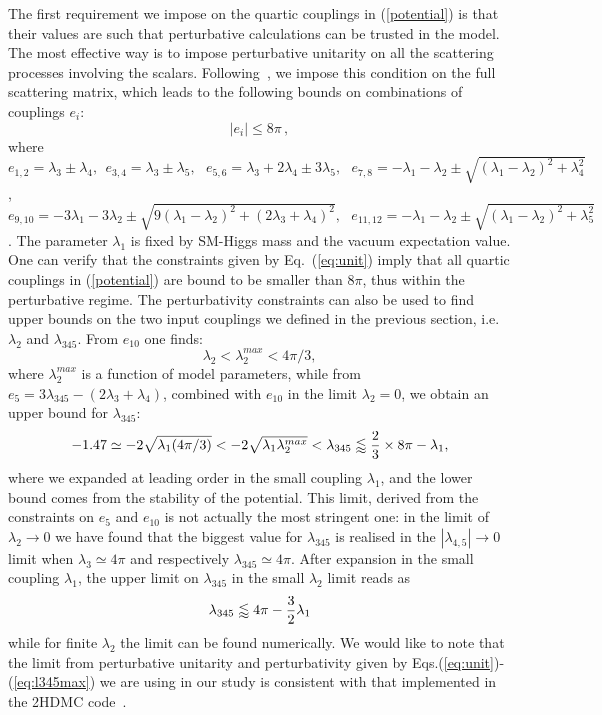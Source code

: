 \documentclass[12pt,a4paper]{article}
\begin{document}
The first requirement we impose on the quartic couplings in (\ref{potential}) is that their values are such that perturbative calculations can be trusted in the model.  The most effective way is to impose perturbative unitarity on all the scattering processes involving the scalars.
Following~\cite{Arhrib:2012ia}, we impose this condition on the full scattering matrix, which leads to the following bounds on combinations of couplings $e_i$:
%
\begin{equation}
\label{eq:unit}
|e_i|\leq 8\pi\,,
\end{equation}
where
$e_{1,2}= \lambda_3 \pm \lambda_4, \ \ e_{3,4}=\lambda_3 \pm \lambda_5, \ \ \
e_{5,6}= \lambda_3 + 2\lambda_4 \pm 3\lambda_5, \ \ \  e_{7,8} = -\lambda_1-\lambda_2 \pm \sqrt{(\lambda_1-\lambda_2)^2+\lambda_4^2}$, $e_{9,10} = -3\lambda_1 - 3\lambda_2 \pm \sqrt{9(\lambda_1 -\lambda_2)^2 + (2\lambda_3+\lambda_4)^2}, \ \ \ 
 e_{11,12} = -\lambda_1 - \lambda_2 \pm \sqrt{(\lambda_1 - \lambda_2)^2 + \lambda_5^2}
$.
The parameter $\lambda_1$ is fixed by SM-Higgs mass and the vacuum expectation value.
One can verify that the constraints given by Eq.~(\ref{eq:unit}) imply that all quartic couplings in (\ref{potential}) are bound to be smaller than $8\pi$, thus within the perturbative regime.
The perturbativity constraints can also be used to find upper bounds on the two input couplings we defined in the previous section, i.e. $\lambda_2$ and $\lambda_{345}$. From $e_{10}$ one finds:
\begin{equation}
\lambda_2<\lambda_2^{max} < 4\pi/3,
\end{equation}
where $\lambda_2^{max}$ is a function of  model parameters,
while from $e_5 = 3 \lambda_{345} - (2 \lambda_3 + \lambda_4)$, combined with $e_{10}$ in the limit $\lambda_2 = 0$, we obtain an upper bound for $\lambda_{345}$:
\begin{equation}
- 1.47 \simeq -2\sqrt{\lambda_1 (4\pi/3)} < -2\sqrt{\lambda_1\lambda_2^{max}}<\lambda_{345}\lessapprox {2\over 3} \times 8\pi - \lambda_1,
\label{eq:l345min}
\end{equation}
where we expanded at leading order in the small coupling $\lambda_1$, and the lower bound comes from the stability of the potential.
This limit, derived from the constraints on $e_5$ and $e_{10}$ is not actually the most stringent one:
in the limit of $\lambda_2 \to 0$ we have found  that the biggest value for $\lambda_{345}$
is realised in the  $|\lambda_{4,5}| \to 0$ limit when $\lambda_3 \simeq  4\pi$ 
and respectively  $\lambda_{345} \simeq 4\pi$.
After expansion in  the small coupling $\lambda_1$, the upper limit on  $\lambda_{345}$ in the small $\lambda_2 $ limit reads as 
\begin{equation}
\lambda_{345}\lessapprox 4\pi-{3\over 2}\lambda_1
\label{eq:l345max}
\end{equation}
while for finite  $\lambda_2 $ the limit can be found numerically.
{We would like to  note that the limit from perturbative unitarity and perturbativity
given by Eqs.(\ref{eq:unit})-(\ref{eq:l345max}) we are using in our study is consistent with  that implemented in the 2HDMC code~\cite{Eriksson:2009ws}.}
\end{document}
